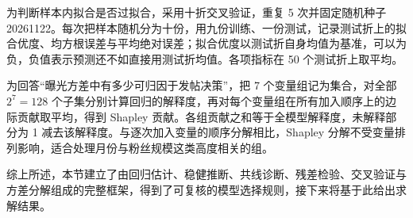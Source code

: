为判断样本内拟合是否过拟合，采用十折交叉验证，重复 5 次并固定随机种子 20261122。每次把样本随机分为十份，用九份训练、一份测试，记录测试折上的拟合优度、均方根误差与平均绝对误差；拟合优度以测试折自身均值为基准，可以为负，负值表示预测还不如直接用测试折均值。各项指标在 50 个测试折上取平均。

为回答“曝光方差中有多少可归因于发帖决策”，把 7 个变量组记为集合，对全部 $2^7=128$ 个子集分别计算回归的解释度，再对每个变量组在所有加入顺序上的边际贡献取平均，得到 Shapley 贡献。各组贡献之和等于全模型解释度，未解释部分为 1 减去该解释度。与逐次加入变量的顺序分解相比，Shapley 分解不受变量排列影响，适合处理月份与粉丝规模这类高度相关的组\cite{shapley1953}。

综上所述，本节建立了由回归估计、稳健推断、共线诊断、残差检验、交叉验证与方差分解组成的完整框架，得到了可复核的模型选择规则，接下来将基于此给出求解结果。

